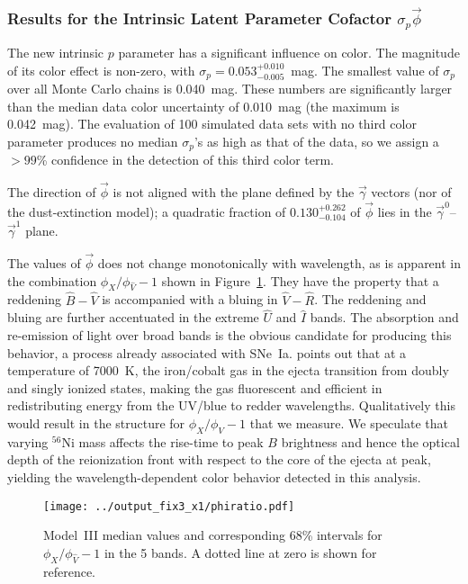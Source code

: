 \documentclass[trackchanges]{aastex61}   	%
\begin{document}
{\subsubsection{Results for the Intrinsic Latent Parameter Cofactor $\sigma_p \vec{\phi}$}

The  new intrinsic $p$ parameter has a significant influence on color.  The magnitude of its color effect is non-zero,
with $\sigma_p = 0.053^{+ 0.010}_{-0.005}$~mag.  The smallest value of $\sigma_p$ %
over all Monte Carlo chains is 0.040~mag.
These numbers are significantly larger than the median data color uncertainty of 0.010~mag (the maximum is 0.042~mag).
The evaluation of 100 simulated data sets with no third color parameter produces no median $\sigma_p$'s  as
high as that of the data, so we assign a $>99$\% confidence in the detection of this third color term.

The direction of $\vec{\phi}$ is not aligned with the plane defined by
the $\vec{\gamma}$ vectors (nor of the   dust-extinction model); a quadratic fraction of
$0.130^{+0.262}_{-0.104}$ of  %
 $\vec{\phi}$ lies in the $\vec{\gamma}^0$--$\vec{\gamma}^1$ plane.


The values of $\vec{\phi}$ does not change  monotonically with wavelength, as is apparent  in 
the combination $\phi_X/\phi_{\hat{V}}-1$ shown in Figure~\ref{phiratio:fig}.  They have the property that
a reddening $\hat{B}-\hat{V}$ is accompanied with a bluing in $\hat{V}-\hat{R}$.  The reddening and bluing are
further accentuated 
in the extreme $\hat{U}$ and $\hat{I}$ bands. The absorption and re-emission of light
over broad bands is the obvious candidate for producing this behavior, a process
already associated with SNe~Ia.
\citet{2006ApJ...649..939K} points out that at a temperature of 7000~K, the iron/cobalt gas in the ejecta transition
from doubly and singly ionized states, making the gas fluorescent and efficient in redistributing energy from the UV/blue to redder
wavelengths.  Qualitatively this would result in the structure for $\phi_X/\phi_V-1$ that we measure.
We speculate that varying $^{56}$Ni mass affects the rise-time to peak $B$ brightness and hence the optical depth
of the reionization front with respect to the core of the ejecta at peak, yielding the wavelength-dependent color behavior
detected in this analysis.

\begin{figure}[htbp] %
   \centering
      \texttt{[image: ../output\_fix3\_x1/phiratio.pdf]}
   \caption{Model~III median values  and corresponding 68\% intervals for $\phi_X/\phi_{\hat{V}}-1$ in the 5 bands.
   A dotted line at zero is shown for reference.
   \label{phiratio:fig}}
\end{figure}


}
\end{document}
